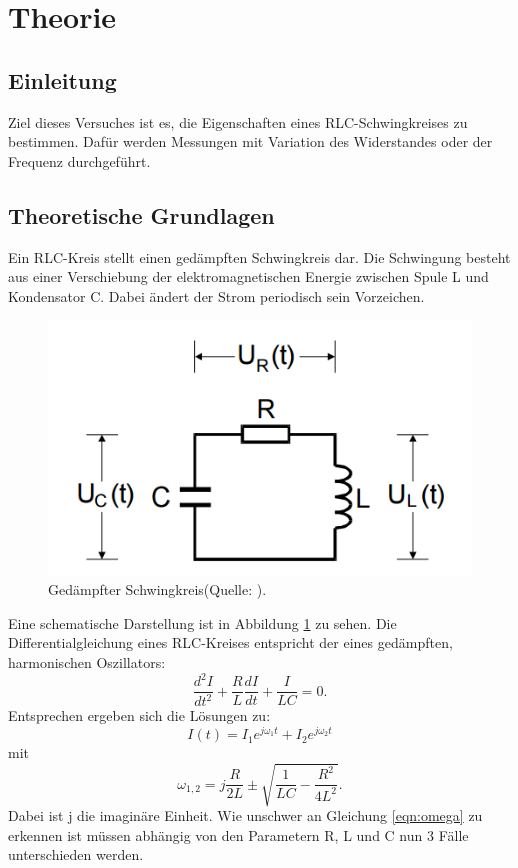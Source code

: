\section{Theorie}
\label{sec:Theorie}

\subsection{Einleitung}
Ziel dieses Versuches ist es, die Eigenschaften eines RLC-Schwingkreises
zu bestimmen. Dafür werden Messungen mit Variation des Widerstandes oder der
Frequenz durchgeführt.

\subsection{Theoretische Grundlagen}
Ein RLC-Kreis stellt einen gedämpften Schwingkreis dar. Die Schwingung besteht
aus einer Verschiebung der elektromagnetischen Energie zwischen
Spule L und Kondensator C.
Dabei ändert der Strom periodisch sein
Vorzeichen.
\begin{figure}
  \centering
  \includegraphics{schwingkreis.png}
  \caption{Gedämpfter Schwingkreis(Quelle: \cite{officialmanual}).}
  \label{fig:RLC}
\end{figure}
Eine schematische Darstellung ist in Abbildung \ref{fig:RLC} zu sehen.
Die Differentialgleichung eines RLC-Kreises entspricht der eines
gedämpften, harmonischen
Oszillators:
\begin{equation}
   \frac{d^2I}{dt^2} + \frac{R}{L} \frac{dI}{dt} + \frac{I}{LC} = 0.
   \label{eqn:dgl}
\end{equation}
Entsprechen ergeben sich die Lösungen zu:
\begin{equation}
  I(t) = I_1 e^{j\omega_1t} + I_2 e^{j\omega_2t}
  \label{eqn:I}
\end{equation}
  mit
\begin{equation}
  \omega_{1,2} = j\frac{R}{2L} \pm \sqrt{\frac{1}{LC} - \frac{R^2}{4L^2}}.
  \label{eqn:omega}
\end{equation}
Dabei ist j die imaginäre Einheit.
Wie unschwer an Gleichung \ref{eqn:omega} zu erkennen ist müssen abhängig von
den Parametern R, L und C nun 3 Fälle unterschieden werden.

